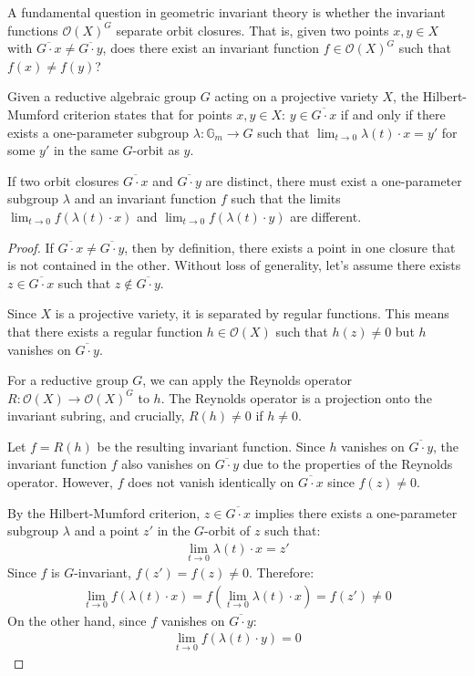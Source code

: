 \documentclass[12pt]{article}
\begin{document}
A fundamental question in geometric invariant theory is whether the invariant functions $\mathcal{O}(X)^G$ separate orbit closures. That is, given two points $x, y \in X$ with $\overline{G \cdot x} \neq \overline{G \cdot y}$, does there exist an invariant function $f \in \mathcal{O}(X)^G$ such that $f(x) \neq f(y)$?


Given a reductive algebraic group $G$ acting on a projective variety $X$, the Hilbert-Mumford criterion states that for points $x, y \in X$: $y \in \overline{G \cdot x}$ if and only if there exists a one-parameter subgroup $\lambda: \mathbb{G}_m \rightarrow G$ such that $\lim_{t \rightarrow 0} \lambda(t) \cdot x = y'$ for some $y'$ in the same $G$-orbit as $y$.

\begin{proposition}
    If two orbit closures $\overline{G \cdot x}$ and $\overline{G \cdot y}$ are distinct, there must exist a one-parameter subgroup $\lambda$ and an invariant function $f$ such that the limits $\lim_{t \rightarrow 0} f(\lambda(t) \cdot x)$ and $\lim_{t \rightarrow 0} f(\lambda(t) \cdot y)$ are different.
\end{proposition}

\begin{proof}
If $\overline{G \cdot x} \neq \overline{G \cdot y}$, then by definition, there exists a point in one closure that is not contained in the other. Without loss of generality, let's assume there exists $z \in \overline{G \cdot x}$ such that $z \notin \overline{G \cdot y}$.

Since $X$ is a projective variety, it is separated by regular functions. This means that there exists a regular function $h \in \mathcal{O}(X)$ such that $h(z) \neq 0$ but $h$ vanishes on $\overline{G \cdot y}$.

For a reductive group $G$, we can apply the Reynolds operator $R: \mathcal{O}(X) \rightarrow \mathcal{O}(X)^G$ to $h$. The Reynolds operator is a projection onto the invariant subring, and crucially, $R(h) \neq 0$ if $h \neq 0$.

Let $f = R(h)$ be the resulting invariant function. Since $h$ vanishes on $\overline{G \cdot y}$, the invariant function $f$ also vanishes on $\overline{G \cdot y}$ due to the properties of the Reynolds operator. However, $f$ does not vanish identically on $\overline{G \cdot x}$ since $f(z) \neq 0$.

By the Hilbert-Mumford criterion, $z \in \overline{G \cdot x}$ implies there exists a one-parameter subgroup $\lambda$ and a point $z'$ in the $G$-orbit of $z$ such that:
\begin{align*}
\lim_{t \rightarrow 0} \lambda(t) \cdot x = z'
\end{align*}
Since $f$ is $G$-invariant, $f(z') = f(z) \neq 0$. Therefore:
\begin{align*}
\lim_{t \rightarrow 0} f(\lambda(t) \cdot x) = f(\lim_{t \rightarrow 0} \lambda(t) \cdot x) = f(z') \neq 0
\end{align*}
On the other hand, since $f$ vanishes on $\overline{G \cdot y}$:
\begin{align*}
\lim_{t \rightarrow 0} f(\lambda(t) \cdot y) = 0
\end{align*}
\end{proof}
\end{document}
